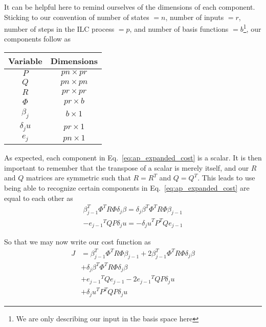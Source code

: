 It can be helpful here to remind ourselves of the dimensions of each component. Sticking to our convention of number of states $= n$, number of inputs $= r$, number of steps in the ILC process $= p$, and number of basis functions $= b$\footnote{We are only describing our input in the basis space here}, our components follow as
\begin{center}
    \begin{tabular}{ c|c }
        Variable & Dimensions \\
        \hline
        $P$ & $pn \times pr$ \\
        $Q$ & $pn \times pn$ \\
        $R$ & $pr \times pr$ \\
        $\Phi$ & $pr \times b$ \\
        $\beta_j$ & $b \times 1$ \\
        $\delta_j u$ & $pr \times 1$ \\
        $e_j$ & $pn \times 1$
    \end{tabular}
\end{center}

As expected, each component in Eq.~\ref{eq:ap_expanded_cost} is a scalar. It is then important to remember that the transpose of a scalar is merely itself, and our $R$ and $Q$ matrices are symmetric such that $R = R^T$ and $Q = Q^T$. This leads to use being able to recognize certain components in Eq.~\ref{eq:ap_expanded_cost} are equal to each other as
\begin{equation}
    \begin{split}
        {\beta_{j-1}^T}\Phi^T R \Phi \delta_j \beta = {\delta_j \beta}^T \Phi^T R \Phi \beta_{j-1} \\
        - {e_{j-1}}^T Q P \delta_j u = - {\delta_j u}^T P^T Q e_{j-1}
    \end{split}
\end{equation}

So that we may now write our cost function as
\begin{equation}
    \begin{split}
        J &= {\beta_{j-1}^T}\Phi^T R \Phi \beta_{j-1} + 2{\beta_{j-1}^T}\Phi^T R \Phi \delta_j \beta \\
        &+ {\delta_j \beta}^T \Phi^T R \Phi \delta_j \beta \\
        &+ {e_{j-1}}^T Q e_{j-1} - 2{e_{j-1}}^T Q P \delta_j u \\
        &+ {\delta_j u}^T P^T Q P \delta_j u
    \end{split}
\end{equation}

